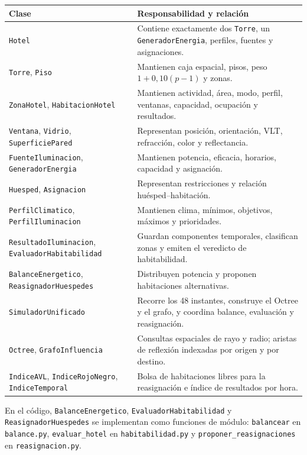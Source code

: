 \documentclass[12pt,a4paper]{article}
\newcommand{\clase}[1]{\texttt{#1}}
\newcommand{\codigo}[1]{\texttt{#1}}
\begin{document}
\begin{center}\small
\begin{tabular}{p{}p{}}
\toprule
\textbf{Clase} & \textbf{Responsabilidad y relación}\\
\midrule
\clase{Hotel} & Contiene exactamente dos \clase{Torre}, un \clase{GeneradorEnergia}, perfiles, fuentes y asignaciones.\\
\clase{Torre}, \clase{Piso} & Mantienen caja espacial, pisos, peso $1+0,10(p-1)$ y zonas.\\
\clase{ZonaHotel}, \clase{HabitacionHotel} & Mantienen actividad, área, modo, perfil, ventanas, capacidad, ocupación y resultados.\\
\clase{Ventana}, \clase{Vidrio}, \clase{SuperficiePared} & Representan posición, orientación, VLT, refracción, color y reflectancia.\\
\clase{FuenteIluminacion}, \clase{GeneradorEnergia} & Mantienen potencia, eficacia, horarios, capacidad y asignación.\\
\clase{Huesped}, \clase{Asignacion} & Representan restricciones y relación huésped--habitación.\\
\clase{PerfilClimatico}, \clase{PerfilIluminacion} & Mantienen clima, mínimos, objetivos, máximos y prioridades.\\
\clase{ResultadoIluminacion}, \clase{EvaluadorHabitabilidad} & Guardan componentes temporales, clasifican zonas y emiten el veredicto de habitabilidad.\\
\clase{BalanceEnergetico}, \clase{ReasignadorHuespedes} & Distribuyen potencia y proponen habitaciones alternativas.\\
\clase{SimuladorUnificado} & Recorre los 48 instantes, construye el Octree y el grafo, y coordina balance, evaluación y reasignación.\\
\clase{Octree}, \clase{GrafoInfluencia} & Consultas espaciales de rayo y radio; aristas de reflexión indexadas por origen y por destino.\\
\clase{IndiceAVL}, \clase{IndiceRojoNegro}, \clase{IndiceTemporal} & Bolsa de habitaciones libres para la reasignación e índice de resultados por hora.\\
\bottomrule
\end{tabular}
\end{center}

En el código, \clase{BalanceEnergetico}, \clase{EvaluadorHabitabilidad} y \clase{ReasignadorHuespedes} se implementan como funciones de módulo: \codigo{balancear} en \codigo{balance.py}, \codigo{evaluar\_hotel} en \codigo{habitabilidad.py} y \codigo{proponer\_reasignaciones} en \codigo{reasignacion.py}.
\end{document}
